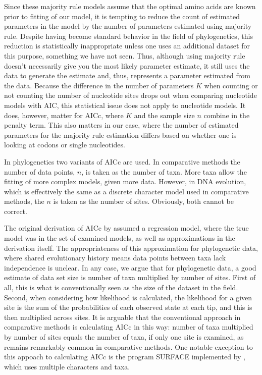 \documentclass[12pt,letterpaper,fleqn]{article}
\begin{document}
Since these majority rule models assume that the optimal amino acids are known prior to fitting of our model, it is tempting to reduce the count of estimated parameters in the model by the number of parameters estimated using majority rule.
Despite having become standard behavior in the field of phylogenetics, this reduction is statistically inappropriate unless one uses an additional dataset for this purpose, something we have not seen.
Thus, although using majority rule doesn't necessarily give you the most likely parameter estimate, it still uses the data to generate the estimate and, thus, represents a parameter estimated from the data.
Because the difference in the number of parameters $K$ when counting or not counting the number of nucleotide sites drops out when comparing nucleotide models with AIC, this statistical issue does not apply to nucleotide models.
It does, however, matter for AICc, where $K$ and the sample size $n$ combine in the penalty term.
This also matters in our case, where the number of estimated parameters for the majority rule estimation differs based on whether one is looking at codons or single nucleotides.

In phylogenetics two variants of AICc are used.
In comparative methods \citep[e.g.~][]{ButlerKing2004, OMearaetal2006, BeaulieuEtAl2013} the number of data points, $n$, is taken as the number of taxa.
More taxa allow the fitting of more complex models, given more data.
However, in DNA evolution, which is effectively the same as a discrete character model used in comparative methods, the $n$ is taken as the number of sites.
Obviously, both cannot be correct.

The original derivation of AICc by \citet{HurvichTsai1989} assumed a regression model, where the true model was in the set of examined models, as well as approximations in the derivation itself.
The appropriateness of this approximation for phylogenetic data, where shared evolutionary history means data points between taxa lack independence is unclear.
In any case, we argue that for phylogenetic data, a good estimate of data set size is number of taxa multiplied by number of sites.
First of all, this is what is conventionally seen as the size of the dataset in the field.
Second, when considering how likelihood is calculated, the likelihood for a given site is the sum of the probabilities of each observed state at each tip, and this is then multiplied across sites.
It is arguable that the conventional approach in comparative methods is calculating AICc in this way: number of taxa multiplied by number of sites equals the number of taxa, if only one site is examined, as remains remarkably common in comparative methods.
One notable exception to this appoach to calculating AICc is the program SURFACE implemented by \citet{IngramMahler2013}, which uses multiple characters and taxa.
\end{document}
